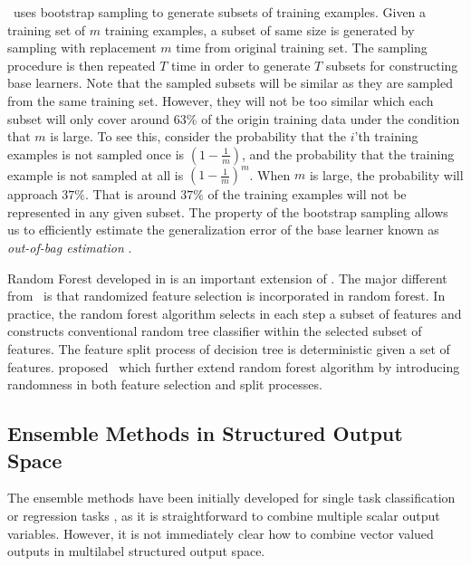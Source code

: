 {\bagging\ uses bootstrap sampling \citep{Efron1994introduction} to generate subsets of training examples.
Given a training set of $m$ training examples, a subset of same size is generated by sampling with replacement $m$ time from original training set.
The sampling procedure is then repeated $T$ time in order to generate $T$ subsets for constructing base learners.
Note that the sampled subsets will be similar as they are sampled from the same training set.
However, they will not be too similar which each subset will only cover around $63\%$ of the origin training data under the condition that $m$ is large.
To see this, consider the probability that the $i$'th training examples is not sampled once is $(1-\frac{1}{m})$, and the probability that the training example is not sampled at all is $(1-\frac{1}{m})^m$.
When $m$ is large, the probability will approach $37\%$. 
That is around $37\%$ of the training examples will not be represented in any given subset.
The property of the bootstrap sampling allows us to efficiently estimate the generalization error of the base learner known as \textit{out-of-bag estimation} \citep{Breiman96out,Tibshirani1996bias,Wolpert99an}.

Random Forest developed in \citep{Breiman01random} is an important extension of \bagging.
The major different from \bagging\ is that randomized feature selection is incorporated in random forest.
In practice, the random forest algorithm selects in each step a subset of features and constructs conventional random tree classifier within the selected subset of features.
The feature split process of decision tree is deterministic given a set of features.
\citet{Liu08spectrum} proposed \vrtree\ which further extend random forest algorithm by introducing randomness in both feature selection and split processes.


\subsection{Ensemble Methods in Structured Output Space}

The ensemble methods have been initially developed for single task classification \citep{Breiman96bagging,Freund97a} or regression tasks \citep{Breiman96bagging}, as it is straightforward to combine multiple scalar output variables.
However, it is not immediately clear how to combine vector valued outputs in multilabel structured output space.

}
